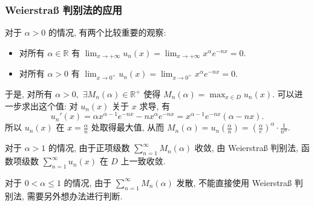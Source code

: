 \begin{frame}
\frametitle{Weierstraß 判别法的应用}

{\color{red}} 对于 $\alpha > 0$ 的情况, 有两个比较重要的观察:
\begin{itemize}
\item 对所有 $\alpha \in \mathbb{R}$ 有 $\lim_{x\to +\infty} u_n(x) = \lim_{x\to +\infty} x^\alpha e^{-nx} = 0.$
\item 对所有 $\alpha > 0$ 有 $\lim_{x\to 0^+} u_n(x) = \lim_{x\to 0^+} x^\alpha e^{-nx} = 0.$
\end{itemize}
于是, 对所有 $\alpha > 0,$ $\exists M_n(\alpha) \in \mathbb{R}^+$ 使得 $M_n(\alpha) = \max_{x \in D} u_n(x).$
\pause
可以进一步求出这个值: 对 $u_n(x)$ 关于 $x$ 求导, 有
\[
u_n'(x) = \alpha x^{\alpha - 1} e^{-nx} - n x^\alpha e^{-nx} = x^{\alpha - 1} e^{-nx} (\alpha - nx).
\]
所以 $u_n(x)$ 在 $x = \frac{\alpha}{n}$ 处取得最大值, 从而 $M_n(\alpha) = u_n\left( \frac{\alpha}{n} \right) = \left( \frac{\alpha}{e} \right)^\alpha \cdot \frac{1}{n^\alpha}.$

\pause
\vspace{0.5em}

{\color{red}} 对于 $\alpha > 1$ 的情况, 由于正项级数 $\sum_{n=1}^\infty M_n(\alpha)$ 收敛, 由 Weierstraß 判别法, 函数项级数 $\displaystyle \sum_{n=1}^\infty u_n(x)$ 在 $D$ 上一致收敛.

\pause
\vspace{0.5em}

{\color{red}} 对于 $0 < \alpha \leqslant 1$ 的情况, 由于 $\sum_{n=1}^\infty M_n(\alpha)$ 发散, 不能直接使用 Weierstraß 判别法, 需要另外想办法进行判断.

\end{frame}


